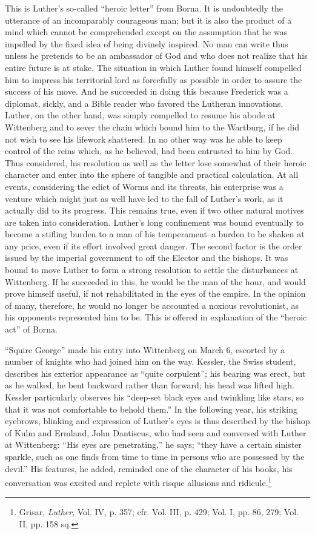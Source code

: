 This is Luther’s so-called “heroic letter” from Borna. It is undoubtedly
the utterance of an incomparably courageous man; but it
is also the product of a mind which cannot be comprehended except
on the assumption that he was impelled by the fixed idea of being
divinely inspired. No man can write thus unless he pretends to be an
ambassador of God and who does not realize that his entire future is
at stake. The situation in which Luther found himself compelled him
to impress his territorial lord as forcefully as possible in order to assure
the success of his move. And he succeeded in doing this because
Frederick was a diplomat, sickly, and a Bible reader who favored
the Lutheran innovations. Luther, on the other hand, was simply
compelled to resume his abode at Wittenberg and to sever the chain
which bound him to the Wartburg, if he did not wish to see his lifework
shattered. In no other way was he able to keep control of the
reins which, as he believed, had been entrusted to him by God.
Thus considered, his resolution as well as the letter lose somewhat
of their heroic character and enter into the sphere of tangible and practical
calculation. At all events, considering the edict of Worms and its
threats, his enterprise was a venture which might just as well
have led to the fall of Luther’s work, as it actually did to its progress.
This remains true, even if two other natural motives are taken into consideration.
Luther’s long confinement was bound eventually to become
a stifling burden to a man of his temperament--a burden to be shaken
at any price, even if its effort involved great danger. The
second factor is the order issued by the imperial government to off
the Elector and the bishops. It was bound to move Luther to form a strong
resolution to settle the disturbances at Wittenberg. If he succeeded in
this, he would be the man of the hour, and would prove himself useful, if not
rehabilitated in the eyes of the empire. In the opinion of many,
therefore, he would no longer be accounted a noxious revolutionist,
as his opponents represented him to be. This is offered in explanation
of the “heroic act” of Borna.

“Squire George” made his entry into Wittenberg on March 6,
escorted by a number of knights who had joined him on the way.
Kessler, the Swiss student, describes his exterior appearance as “quite
corpulent”; his bearing was erect, but as he walked, he bent backward
rather than forward; his head was lifted high. Kessler particularly
observes his “deep-set black eyes and twinkling like stars, so that it was not
comfortable to behold them.”
In the following year, his striking eyebrows, blinking and
expression of Luther’s eyes is thus
described by the bishop of Kulm and Ermland, John Dantiscus, who
had seen and conversed with Luther at Wittenberg: “His eyes are
penetrating,” he says; “they have a certain sinister sparkle, such as
one finds from time to time in persons who are possessed by the
devil.” His features, he added, reminded one of the character of his
books, his conversation was excited and replete with risque allusions
and ridicule.\footnote
{Grisar, \textit{Luther}, Vol. IV, p. 357; cfr. Vol. III, p. 429; Vol. I, pp. 86, 279; Vol. II,
pp. 158 sq.}

